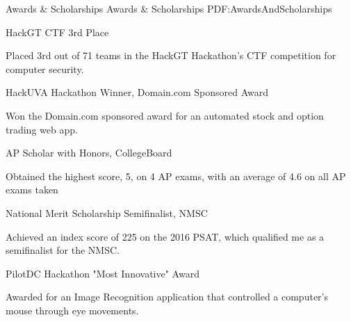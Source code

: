 \documentclass[letterpaper,MMMyyyy,nonstopmode]{style}
\begin{document}
\begin{Body}
\begin{comment}
\SubSection
{Conferences}
{Conferences}
{PDF:Conferences}

\begingroup
\renewcommand{\MaxNumberedItem}{[8888]}

\Gap
\NumberedItem{[1]}
{\underline{Kevin Zou} and Amarda Shehu,
``Memetic Evolutionary Algorithms for De-novo Protein Structure Prediction,''
\textit{ACM Bioinformatics and Computational Biology Conference, 2018}. In Preparation.}

\endgroup
\end{comment}


\Section
{Awards \&\newline
Scholarships}
{Awards \& Scholarships}
{PDF:AwardsAndScholarships}

\Gap
\BulletItem
HackGT CTF 3rd Place
\hfill
{}
\begin{Detail}
\Item
Placed 3rd out of 71 teams in the HackGT Hackathon's CTF competition for computer security.
\end{Detail}


\Gap
\BulletItem
HackUVA Hackathon Winner, Domain.com Sponsored Award
\hfill
{}
\begin{Detail}
\Item
Won the Domain.com sponsored award for an automated stock and option trading web app.
\end{Detail}

\Gap
\BulletItem
AP Scholar with Honors,
CollegeBoard
\hfill
{}
\begin{Detail}
\Item
Obtained the highest score, 5, on 4 AP exams, with an average of 4.6 on all AP exams taken\end{Detail}

\Gap
\BulletItem
National Merit Scholarship Semifinalist, NMSC
\hfill
{}
\begin{Detail}
\Item
Achieved an index score of 225 on the 2016 PSAT, which qualified me as a semifinalist for the NMSC.
\end{Detail}

\BulletItem
PilotDC Hackathon "Most Innovative" Award
\hfill
{}
\begin{Detail}
\Item
Awarded for an Image Recognition application that controlled a computer's mouse through eye movements.
\end{Detail}



\end{Body}
\end{document}
